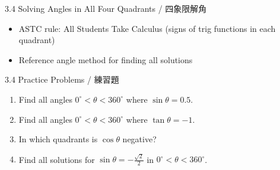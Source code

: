 \documentclass[aspectratio=169]{beamer}
\begin{document}
\begin{frame}{3.4 Solving Angles in All Four Quadrants / 四象限解角}
    \begin{tcolorbox}[colback=lightgray,colframe=primary,title=Key Points]
        \footnotesize
        \begin{itemize}
            \item ASTC rule: All Students Take Calculus (signs of trig functions in each quadrant)
            \item Reference angle method for finding all solutions
        \end{itemize}
    \end{tcolorbox}
    \vspace{0.5em}
    \begin{center}
    \end{center}
\end{frame}

\begin{frame}{3.4 Practice Problems / 練習題}
    \begin{tcolorbox}[colback=lightgray,colframe=accent,title=Practice]
        \footnotesize
        \begin{enumerate}
            \item Find all angles $0^\circ < \theta < 360^\circ$ where $\sin \theta = 0.5$.
            \item Find all angles $0^\circ < \theta < 360^\circ$ where $\tan \theta = -1$.
            \item In which quadrants is $\cos \theta$ negative?
            \item Find all solutions for $\sin \theta = -\frac{\sqrt{2}}{2}$ in $0^\circ < \theta < 360^\circ$.
        \end{enumerate}
    \end{tcolorbox}
\end{frame}
\end{document}
